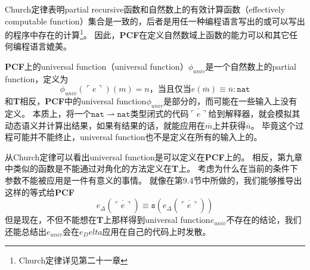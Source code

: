 Church定律表明\gls{partial recursive}函数和自然数上的有效计算函数（effectively computable function）集合是一致的，后者是用任一种编程语言写出的或可以写出的程序中存在的计算\footnote{Church定律详见第二十一章}。
因此，\textbf{PCF}在定义自然数域上函数的能力可以和其它任何编程语言媲美。

\textbf{PCF}上的\gls{universal function}（universal function）\(\phi_{univ}\)是一个自然数上的\gls{partial function}，定义为
\[
	\phi_{univ}(\ulcorner  e \urcorner)(m) = n \text{，当且仅当} e(\overline{m}) \equiv \overline{n}: \mathtt{nat}
\]
和\textbf{T}相反，\textbf{PCF}中的\gls{universal function}\(\phi_{univ}\)是部分的，而可能在一些输入上没有定义。
本质上，将一个\(\mathtt{nat} \rightharpoonup \mathtt{nat}\)类型闭式的代码\(\overline{\ulcorner e \urcorner}\)给到解释器，就会模拟其动态语义并计算出结果，如果有结果的话，就能应用在\(\overline{m}\)上并获得\(\overline{n}\)。
毕竟这个过程可能并不能终止，\gls{universal function}也不是定义在所有的输入上的。

从Church定律可以看出\gls{universal function}是可以定义在\textbf{PCF}上的。
相反，第九章中类似的函数是不能通过对角化的方法定义在\textbf{T}上。
考虑为什么在当前的条件下参数不能被应用是一件有意义的事情。
就像在第9.4节中所做的，我们能够推导出这样的等式给\textbf{PCF}
\[
	e_\Delta(\overline{\ulcorner e \urcorner}) \equiv \mathtt{s}(e_\Delta(\overline{\ulcorner e \urcorner}))
\]
但是现在，不但不能想在\textbf{T}上那样得到\gls{universal function}\(e_{univ}\)不存在的结论，我们还能总结出\(e_{univ}\)会在\(e_Delta\)应用在自己的代码上时发散。
